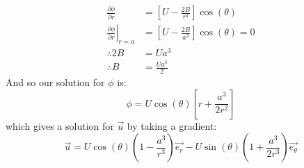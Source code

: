 \documentclass[../Main.tex]{subfiles}
\begin{document}
\begin{align*}
    \frac{\partial \phi}{\partial r} &= \left[U - \frac{2B}{r^3}\right]\cos(\theta) \\
    \left.\frac{\partial \phi}{\partial r}\right|_{r = a} &= \left[U - \frac{2B}{a^3}\right]\cos(\theta) = 0 \\
    \therefore 2B &= Ua^3 \\
    \therefore B &= \frac{Ua^3}{2}
\end{align*}
And so our solution for $\phi$ is:
\begin{equation*}
    \phi = U \cos(\theta) \left[r + \frac{a^3}{2r^2}\right]
\end{equation*}
which gives a solution for $\vec{u}$ by taking a gradient:
\begin{equation*}
    \vec{u} = U \cos(\theta) \left(1 - \frac{a^3}{r^3}\right)\vec{e_r} - U \sin(\theta) \left(1 + \frac{a^3}{2r^3}\right)\vec{e_\theta}
\end{equation*}
\end{document}
